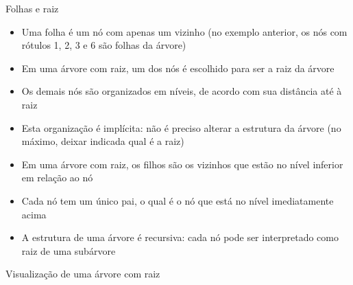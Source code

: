 \begin{frame}[fragile]{Folhas e raiz}

    \begin{itemize}
        \item Uma folha é um nó com apenas um vizinho (no exemplo anterior, os nós com rótulos 
            1, 2, 3 e 6 são folhas da árvore)

        \item Em uma árvore com raiz, um dos nós é escolhido para ser a raiz da árvore

        \item Os demais nós são organizados em níveis, de acordo com sua distância até à raiz

        \item Esta organização é implícita: não é preciso alterar a estrutura da árvore (no
            máximo, deixar indicada qual é a raiz)

        \item Em uma árvore com raiz, os filhos são os vizinhos que estão no nível inferior em
            relação ao nó

        \item Cada nó tem um único pai, o qual é o nó que está no nível imediatamente acima

        \item A estrutura de uma árvore é recursiva: cada nó pode ser interpretado como
            raiz de uma subárvore
    \end{itemize}

\end{frame}

\begin{frame}[fragile]{Visualização de uma árvore com raiz}


\end{frame}


